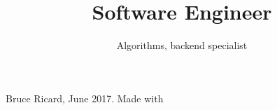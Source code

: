 \documentclass{curve}
\title{Software Engineer}
\subtitle{Algorithms, backend specialist}
\begin{document}
\makeheaders[t]
\maketitle

\newpage
\makeheaders[t]


\vfill
\begin{center}
\tiny Bruce Ricard, June 2017. Made with \LaTeXe
\end{center}
\end{document}
